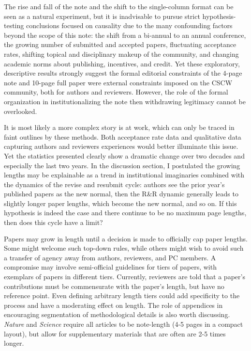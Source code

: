 \documentclass[format=acmsmall, screen=true]{acmart}
\begin{document}
The rise and fall of the note and the shift to the single-column format can be seen as a natural experiment, but it is inadvisable to pursue strict hypothesis-testing conclusions focused on causality due to the many confounding factors beyond the scope of this note: the shift from a bi-annual to an annual conference, the growing number of submitted and accepted papers, fluctuating acceptance rates, shifting topical and disciplinary makeup of the community, and changing academic norms about publishing, incentives, and credit. Yet these exploratory, descriptive results strongly suggest the formal editorial constraints of the 4-page note and 10-page full paper were external constraints imposed on the CSCW community, both for authors and reviewers. However, the role of the formal organization in institutionalizing the note then withdrawing legitimacy cannot be overlooked. 

It is most likely a more complex story is at work, which can only be traced in faint outlines by these methods. Both acceptance rate data and qualitative data capturing authors and reviewers experiences would better illuminate this issue. Yet the statistics presented clearly show a dramatic change over two decades and especially the last two years. In the discussion section, I postulated the growing lengths may be explainable as a trend in institutional imaginaries combined with the dynamics of the revise and resubmit cycle: authors see the prior year's published papers as the new normal, then the R\&R dynamic generally leads to slightly longer paper lengths, which become the new normal, and so on. If this hypothesis is indeed the case and there continue to be no maximum page lengths, then does this cycle have a limit?

Papers may grow in length until a decision is made to officially cap paper lengths. Some might welcome such top-down rules, while others might wish to avoid such a transfer of agency away from authors, reviewers, and PC members. A compromise may involve semi-official guidelines for tiers of papers, with exemplars of papers in different tiers. Currently, reviewers are told that a paper's contributions must be commensurate with the paper's length, but have no reference point. Even defining arbitrary length tiers could add specificity to the process and have a moderating effect on length. The role of appendices in encouraging segmentation of methodological details is also worth discussing. \textit{Nature} and \textit{Science} require all articles to be note-length (4-5 pages in a compact layout), but allow for supplementary materials that are often are 2-5 times longer.
\end{document}
